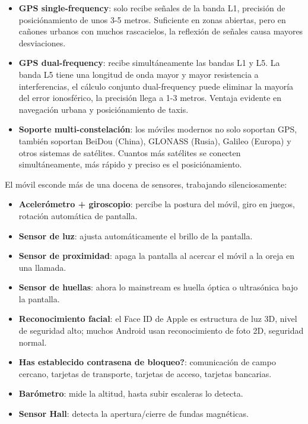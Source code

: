 \begin{itemize}
  \item \textbf{GPS single-frequency}: solo recibe señales de la banda L1, precisión de posiciónamiento de unos 3-5 metros. Suficiente en zonas abiertas, pero en cañones urbanos con muchos rascacielos, la reflexión de señales causa mayores desviaciones.
  \item \textbf{GPS dual-frequency}: recibe simultáneamente las bandas L1 y L5. La banda L5 tiene una longitud de onda mayor y mayor resistencia a interferencias, el cálculo conjunto dual-frequency puede eliminar la mayoría del error ionosférico, la precisión llega a 1-3 metros. Ventaja evidente en navegación urbana y posiciónamiento de taxis.
  \item \textbf{Soporte multi-constelación}: los móviles modernos no solo soportan GPS, también soportan BeiDou (China), GLONASS (Rusia), Galileo (Europa) y otros sistemas de satélites. Cuantos más satélites se conecten simultáneamente, más rápido y preciso es el posiciónamiento.
\end{itemize}


El móvil esconde más de una docena de sensores, trabajando silenciosamente:

\begin{itemize}
  \item \textbf{Acelerómetro + giroscopio}: percibe la postura del móvil, giro en juegos, rotación automática de pantalla.
  \item \textbf{Sensor de luz}: ajusta automáticamente el brillo de la pantalla.
  \item \textbf{Sensor de proximidad}: apaga la pantalla al acercar el móvil a la oreja en una llamada.
  \item \textbf{Sensor de huellas}: ahora lo mainstream es huella óptica o ultrasónica bajo la pantalla.
  \item \textbf{Reconocimiento facial}: el Face ID de Apple es estructura de luz 3D, nivel de seguridad alto; muchos Android usan reconocimiento de foto 2D, seguridad normal.
  \item \textbf{Has establecido contrasena de bloqueo?}: comunicación de campo cercano, tarjetas de transporte, tarjetas de acceso, tarjetas bancarias.
  \item \textbf{Barómetro}: mide la altitud, hasta subir escaleras lo detecta.
  \item \textbf{Sensor Hall}: detecta la apertura/cierre de fundas magnéticas.
\end{itemize}


